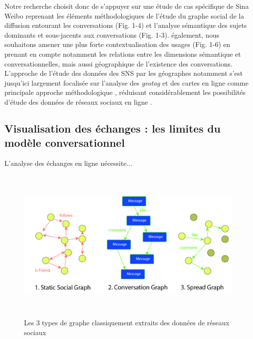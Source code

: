 Notre recherche choisit donc de s{\textquoteright}appuyer sur une étude de cas spécifique de Sina Weibo reprenant les éléments méthodologiques de l{\textquoteright}étude du graphe social de la diffusion entourant les conversations (Fig. 1-4) et l{\textquoteright}analyse sémantique des sujets dominants et sous-jacents aux conversations (Fig. 1-3). également, nous souhaitons amener une plus forte contextualisation des usages (Fig. 1-6) en prenant en compte notamment les relations entre les dimensions sémantique et conversationnelles, mais aussi géographique de l{\textquoteright}existence des conversations. L{\textquoteright}approche de l{\textquoteright}étude des données des SNS par les géographes notamment s{\textquoteright}est jusqu{\textquoteright}ici largement focalisée sur l{\textquoteright}analyse des \textit{geotag} et des cartes en ligne comme principale approche méthodologique \citep{Graham2011, Poorthuis2013}, réduisant considérablement les possibilités d{\textquoteright}étude des données de réseaux sociaux en ligne \citep{Crampton2013}. 


\subsection[Visualisation des échanges : les limites du modèle conversationnel]{Visualisation des échanges : les limites du modèle conversationnel}

L'analyse des échanges en ligne nécessite...

\begin{figure}[h!]
    \centering
    \includegraphics[width=6.2894in,height=3.0004in]{figures/chap3/chapitre3-img9.jpg}
    \caption[3 modèles de réseau]{Les 3 types de graphe classiquement extraits des données de réseaux sociaux}
\end{figure}

